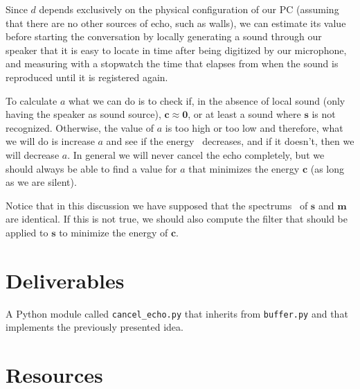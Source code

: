 Since $d$ depends exclusively on the physical configuration of our PC
(assuming that there are no other sources of echo, such as walls), we
can estimate its value before starting the conversation by locally
generating a sound through our speaker that it is easy to locate in
time after being digitized by our microphone, and measuring with a
stopwatch the time that elapses from when the sound is reproduced
until it is registered again.

To calculate $a$ what we can do is to check if, in the absence of
local sound (only having the speaker as sound source),
${\mathbf c}\approx{\mathbf 0}$, or at least a sound where
${\mathbf s}$ is not recognized. Otherwise, the value of $a$ is too
high or too low and therefore, what we will do is increase $a$ and see
if the energy~\cite{vetterli2014foundations} decreases, and if it doesn't, then we will decrease
$a$. In general we will never cancel the echo completely, but we
should always be able to find a value for $a$ that minimizes the
energy ${\mathbf c}$ (as long as we are silent).

Notice that in this discussion we have supposed that the spectrums~\cite{kovacevic2013fourier,Oppenheim2} of
${\mathbf s}$ and ${\mathbf m}$ are identical. If this is not true, we
should also compute the filter that should be applied to ${\mathbf s}$ to
minimize the energy of ${\mathbf c}$.

\section{Deliverables}

A Python module called \texttt{cancel\_echo.py} that inherits from
\texttt{buffer.py} and that implements the previously presented idea.

\section{Resources}


